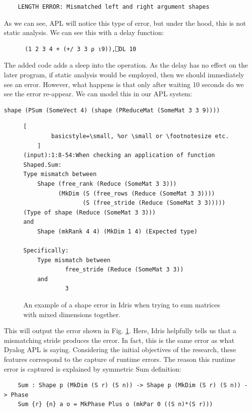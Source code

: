 \documentclass{report}
\begin{document}
\begin{verbatim}
    LENGTH ERROR: Mismatched left and right argument shapes
\end{verbatim}

As we can see, APL will notice this type of error, but under the hood, this is not static analysis. We can see this with a delay function:

\begin{verbatim}
      (1 2 3 4 + (+/ 3 3 ⍴ ⍳9)),⎕DL 10
\end{verbatim}

The added code adds a sleep into the operation. As the delay has no effect on the later program, if static analysis would be employed, then we should immediately see an error. However, what happens is that only after waiting 10 seconds do we see the error re-appear. We can model this in our APL system:

\begin{verbatim}
shape (PSum (SomeVect 4) (shape (PReduceMat (SomeMat 3 3 9))))
\end{verbatim}

\begin{figure}
    \begin{lstlisting}[
        basicstyle=\small, %or \small or \footnotesize etc.
    ]
(input):1:8-54:When checking an application of function Shaped.Sum:
Type mismatch between
    Shape (free_rank (Reduce (SomeMat 3 3)))
          (MkDim (S (free_rows (Reduce (SomeMat 3 3))))
                 (S (free_stride (Reduce (SomeMat 3 3))))) (Type of shape (Reduce (SomeMat 3 3)))
and
    Shape (mkRank 4 4) (MkDim 1 4) (Expected type)

Specifically:
    Type mismatch between
            free_stride (Reduce (SomeMat 3 3))
    and
            3
    \end{lstlisting}
    \caption{An example of a shape error in Idris when trying to sum matrices with mixed dimensions together.}
    \label{fig:shapeerror}
\end{figure}

This will output the error shown in Fig. \ref{fig:shapeerror}. Here, Idris helpfully tells us that a mismatching stride produces the error. In fact, this is the same error as what Dyalog APL is saying. Considering the initial objectives of the research, these features correspond to the capture of runtime errors. The reason this runtime error is captured is explained by symmetric Sum definition:

\begin{verbatim}
    Sum : Shape p (MkDim (S r) (S n)) -> Shape p (MkDim (S r) (S n)) -> Phase
    Sum {r} {n} a o = MkPhase Plus o (mkPar 0 ((S n)*(S r)))
\end{verbatim}
\end{document}
